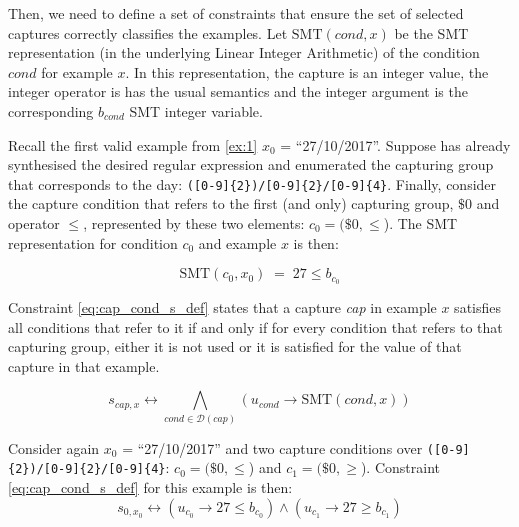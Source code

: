 Then, we need to define a set of constraints that ensure the set of selected captures correctly classifies the examples.
Let \(\textrm{SMT}(\textit{cond}, x)\) be the \ac{SMT} representation (in the underlying Linear Integer Arithmetic) of the condition \(\textit{cond}\) for example \(x\).
In this representation, the capture is an integer value, the integer operator is has the usual semantics and the integer argument is the corresponding \(b_{\textit{cond}}\) \ac{SMT} integer variable.

\begin{example}
Recall the first valid example from \autoref{ex:1} \(x_0\) = ``27/10/2017''.
%
Suppose \Forest has already synthesised the desired regular expression and enumerated the capturing group that corresponds to the day: \verb`([0-9]{2})/[0-9]{2}/[0-9]{4}`. 
%
Finally, consider the capture condition that refers to the first (and only) capturing group, \(\$0\) and operator \(\le\), represented by these two elements: \(c_0 = (\$0, \le\)).
%
The SMT representation for condition \(c_0\) and example \(x\) is then:

\[\textrm{SMT}(c_0, x_0)\; =\;  27 \le b_{c_0}\]
\end{example}

Constraint \ref{eq:cap_cond_s_def} states that a capture \textit{cap} in example \(x\) satisfies all conditions that refer to it if and only if for every condition that refers to that capturing group, either it is not used or it is satisfied for the value of that capture in that example.

\begin{equation}\label{eq:cap_cond_s_def}
    s_{cap,x} \leftrightarrow \bigwedge_{cond \in \mathcal{D}(cap)} (u_{cond} \rightarrow \textrm{SMT}(\textit{cond}, x))
\end{equation}

\begin{example}
Consider again \(x_0\) = ``27/10/2017'' and two capture conditions over \verb`([0-9]{2})/[0-9]{2}/[0-9]{4}`: \(c_0 = (\$0, \le\)) and \(c_1 = (\$0, \ge\)). Constraint \eqref{eq:cap_cond_s_def} for this example is then:
%
\begin{equation*}\label{eq:cap_cond_s_def}
    s_{0,x_0} \leftrightarrow (u_{c_0} \rightarrow 27 \le b_{c_0}) 
    \land (u_{c_1} \rightarrow 27 \ge b_{c_1})
\end{equation*}

\end{example}

